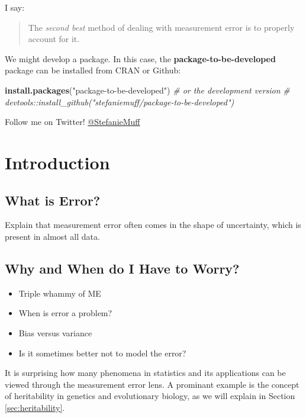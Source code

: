 \documentclass[]{book}
\newenvironment{Shaded}{\begin{snugshade}}{\end{snugshade}}
\newcommand{\KeywordTok}[1]{\textcolor[rgb]{0.13,0.29,0.53}{\textbf{#1}}}
\newcommand{\StringTok}[1]{\textcolor[rgb]{0.31,0.60,0.02}{#1}}
\newcommand{\CommentTok}[1]{\textcolor[rgb]{0.56,0.35,0.01}{\textit{#1}}}
\newcommand{\NormalTok}[1]{#1}
\providecommand{\tightlist}{%
  \setlength{\itemsep}{0pt}\setlength{\parskip}{0pt}}
\theoremstyle{definition}
\theoremstyle{definition}
\theoremstyle{definition}
\theoremstyle{remark}
\begin{document}
I say:

\begin{quote}
The \emph{second best} method of dealing with measurement error is to
properly account for it.
\end{quote}

We might develop a package. In this case, the
\textbf{package-to-be-developed} package can be installed from CRAN or
Github:

\begin{Shaded}
\begin{Highlighting}[]
\KeywordTok{install.packages}\NormalTok{(}\StringTok{"package-to-be-developed"}\NormalTok{)}
\CommentTok{# or the development version}
\CommentTok{# devtools::install_github("stefaniemuff/package-to-be-developed")}
\end{Highlighting}
\end{Shaded}

Follow me on Twitter!
\href{https://twitter.com/stefaniemuff}{@StefanieMuff}

\chapter{Introduction}\label{intro}

\section{What is Error?}\label{what-is-error}

Explain that measurement error often comes in the shape of uncertainty,
which is present in almost all data.

\section{Why and When do I Have to
Worry?}\label{why-and-when-do-i-have-to-worry}

\begin{itemize}
\tightlist
\item
  Triple whammy of ME
\item
  When is error a problem?
\item
  Bias versus variance
\item
  Is it sometimes better not to model the error?
\end{itemize}

It is surprising how many phenomena in statistics and its applications
can be viewed through the measurement error lens. A prominant example is
the concept of heritability in genetics and evolutionary biology, as we
will explain in Section \ref{sec:heritability}.
\end{document}
